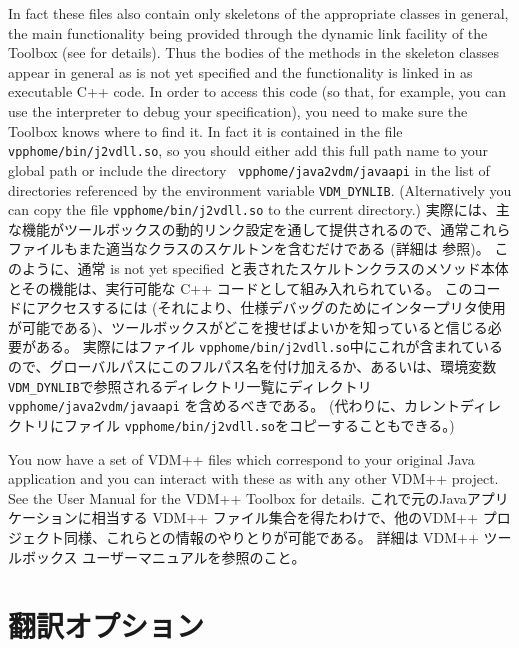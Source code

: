 \documentclass[\pformat,12pt]{jarticle}
\newcommand{\vdmhome}{vpphome}
\begin{document}
In fact these files also contain only skeletons of the appropriate
classes in general, the main functionality being provided through the
dynamic link facility of the Toolbox (see \cite{DLMan-CSK} for
details). Thus the bodies of the methods in the skeleton classes
appear in general as \textsf{is not yet specified} and the
functionality is linked in as executable C++ code. In order to access
this code (so that, for example, you can use the interpreter to debug
your specification), you need to make sure the Toolbox knows where to
find it. In fact it is contained in the file {\tt
  \vdmhome/bin/j2vdll.so}, so you should either add this full 
path name to your global path or include the directory {\tt
  \vdmhome/java2vdm/javaapi} in the list of directories referenced by the
environment variable {\tt VDM\_DYNLIB}. (Alternatively you can copy
the file {\tt \vdmhome/bin/j2vdll.so} to the current directory.)
実際には、主な機能がツールボックスの動的リンク設定を通して提供されるので、通常これらファイルもまた適当なクラスのスケルトンを含むだけである (詳細は\cite{DLMan-CSK} 参照)。 
このように、通常 \textsf{is not yet specified} と表されたスケルトンクラスのメソッド本体とその機能は、実行可能な C++ コードとして組み入れられている。
このコードにアクセスするには (それにより、仕様デバッグのためにインタープリタ使用が可能である)、ツールボックスがどこを捜せばよいかを知っていると信じる必要がある。 
実際にはファイル {\tt  \vdmhome/bin/j2vdll.so}中にこれが含まれているので、グローバルパスにこのフルパス名を付け加えるか、あるいは、環境変数 {\tt VDM\_DYNLIB}で参照されるディレクトリ一覧にディレクトリ {\tt  \vdmhome/java2vdm/javaapi} を含めるべきである。
(代わりに、カレントディレクトリにファイル {\tt \vdmhome/bin/j2vdll.so}をコピーすることもできる。)

You now have a set of VDM++ files which correspond to your original
Java application and you can interact with these as with any other
VDM++ project. See the User Manual for the VDM++ Toolbox
\cite{UserManPP-CSK} for details.
これで元のJavaアプリケーションに相当する VDM++ ファイル集合を得たわけで、他のVDM++ プロジェクト同様、これらとの情報のやりとりが可能である。
詳細は VDM++ ツールボックス\cite{UserManPP-CSK} ユーザーマニュアルを参照のこと。

\section{翻訳オプション}
\end{document}
